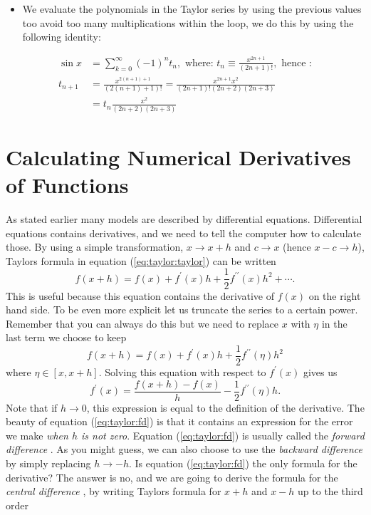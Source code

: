 \documentclass[graybox,sectrefs,envcountresetchap,open=right,final]{svmonodo}
\newenvironment{graybox2admon}[1][]{
\begin{graybox2mdframed}[frametitle=#1]
}
{
\end{graybox2mdframed}
}
\begin{document}
\begin{graybox2admon}[Example: evaluate $\sin x$]
\begin{itemize}
\item We evaluate the polynomials in the Taylor series by using the previous values too avoid too many multiplications within the loop, we do this by using the following identity:
\end{itemize}

\noindent
  \begin{align}
  \sin x&=\sum_{k=0}^{\infty} (-1)^nt_n, \text{ where: } t_n\equiv\frac{x^{2n+1}}{(2n+1)!}, \text{ hence :}\nonumber\\ 
  t_{n+1}&=\frac{x^{2(n+1)+1}}{(2(n+1)+1)!}=\frac{x^{2n+1}x^2}{(2n+1)! (2n+2)(2n+3)}\nonumber\\ 
  &=t_n\frac{x^2}{(2n+2)(2n+3)}
  \end{align}
\end{graybox2admon}




\section{Calculating Numerical Derivatives of Functions}

As stated earlier many models are described by differential equations. Differential equations contains derivatives, and we need to tell the computer how to calculate those. By using a simple transformation, $x\to x+h$ and $c\to x$ (hence $x-c\to h$), Taylors formula in equation (\ref{eq:taylor:taylor}) can be written
\begin{equation}
f(x+h)=f(x)+f^\prime(x)h+\frac{1}{2}f^{\prime\prime}(x)h^2+\cdots.
\label{eq:taylor:t}
\end{equation}
This is useful because this equation contains the derivative of $f(x)$ on the right hand side. To be even more explicit let us truncate the series to a certain power. Remember that you can always do this but we need to replace $x$ with $\eta$ in the last term we choose to keep
\begin{equation}
f(x+h)=f(x)+f^\prime(x)h+\frac{1}{2}f^{\prime\prime}(\eta)h^2
\label{eq:taylor:t3}
\end{equation}
where $\eta\in[x,x+h]$. Solving this equation with respect to $f^\prime(x)$ gives us
\begin{equation}
f^\prime(x)=\frac{f(x+h)-f(x)}{h}-\frac{1}{2}f^{\prime\prime}(\eta)h.
\label{eq:taylor:fd}
\end{equation}
Note that if $h\to0$, this expression is equal to the definition of the derivative. The beauty of equation (\ref{eq:taylor:fd}) is that it contains an expression for the error we make \emph{when $h$ is not zero}. Equation (\ref{eq:taylor:fd}) is usually called the \emph{forward difference} . As you might guess, we can also choose to use the \emph{backward difference}  by simply replacing $h\to-h$. Is equation (\ref{eq:taylor:fd}) the only formula for the derivative? The answer is no, and we are going to derive the formula for the \emph{central difference} , by writing Taylors formula for $x+h$ and $x-h$ up to the third order
\end{document}
